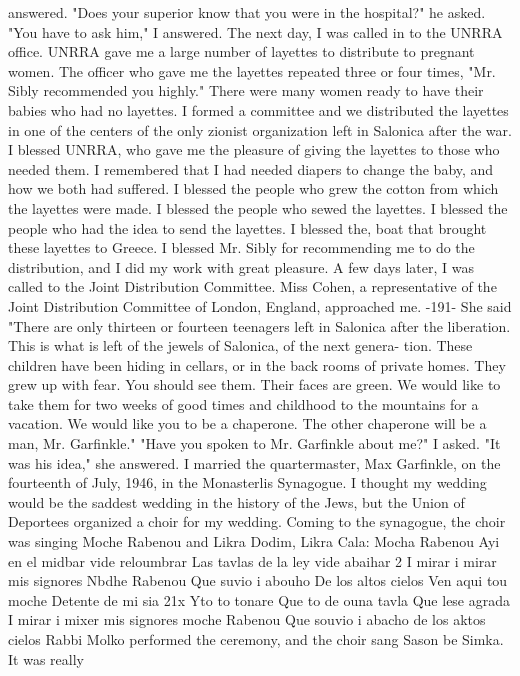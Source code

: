 answered. 
"Does your superior know that you were in the hospital?" he asked. 
"You have to ask him," I answered. 
The next day, I was called in to the UNRRA office. UNRRA gave me a large number 
of layettes to distribute to pregnant women. The officer who gave me the layettes repeated three or four times, "Mr. Sibly recommended you highly." 
There were many women ready to have their babies who had no layettes. I formed 
a committee and we distributed the layettes in one of the centers of the only zionist organization  
left in Salonica after the war. I blessed UNRRA, who gave me the pleasure of giving the layettes to those who needed them. I remembered that I had needed 
diapers to change the baby, and how we both had suffered. I blessed the people who 
grew the cotton from which the layettes were made. I blessed the people who sewed the 
layettes. I blessed the people who had the idea to send the layettes. I blessed the, 
boat that brought these layettes to Greece. I blessed Mr. Sibly for recommending me 
to do the distribution, and I did my work with great pleasure. 
A few days later, I was called to the Joint Distribution Committee. Miss Cohen, 
a representative of the Joint Distribution Committee of London, England, approached me. 
-191- 
She said "There are only thirteen or fourteen teenagers left in Salonica after 
the liberation. This is what is left of the jewels of Salonica, of the next genera-
tion. These children have been hiding in cellars, or in the back rooms of private 
homes. They grew up with fear. You should see them. Their faces are green. We 
would like to take them for two weeks of good times and childhood to the mountains 
for a vacation. We would like you to be a chaperone. The other chaperone will be a 
man, Mr. Garfinkle." 
"Have you spoken to Mr. Garfinkle about me?" I asked. 
"It was his idea," she answered. 
I married the quartermaster, Max Garfinkle, on the fourteenth of July, 1946, in 
the Monasterlis Synagogue. I thought my wedding would be the saddest wedding in the 
history of the Jews, but the Union of Deportees organized a choir for my wedding. Coming to the synagogue, the choir was singing Moche Rabenou and Likra Dodim, Likra Cala: 
Mocha Rabenou 
Ayi en el midbar vide reloumbrar 
Las tavlas de la ley vide abaihar 
2 
I mirar i mirar mis signores 
Nbdhe Rabenou 
Que suvio i abouho 
De los altos cielos 
Ven aqui tou moche 
Detente de mi sia 
21x Yto to tonare 
Que to de ouna tavla 
Que lese agrada 
I mirar i mixer mis signores 
moche Rabenou 
Que souvio i abacho de los aktos cielos 
Rabbi Molko performed the ceremony, and the choir sang Sason be Simka. It was really 
